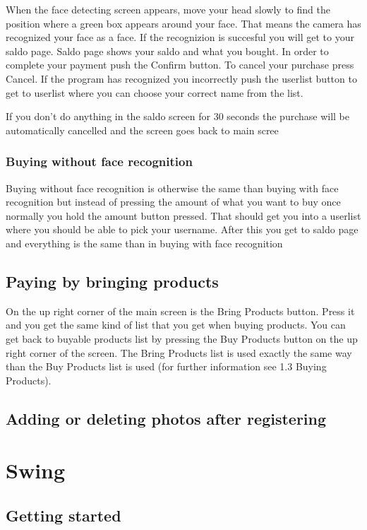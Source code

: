 \documentclass[11pt]{article}
\begin{document}
When the face detecting screen appears, move your head slowly to find the position where a green box appears around your face. That means the camera has recognized your face as a face. If the recognizion is succesful you will get to your saldo page. Saldo page shows your saldo and what you bought. In order to complete your payment push the Confirm button. To cancel your purchase press Cancel. If the program has recognized you incorrectly push the userlist button to get to userlist where you can choose your correct name from the list.

If you don’t do anything in the saldo screen for 30 seconds the purchase will be automatically cancelled and the screen goes back to main scree

\subsubsection*{Buying without face recognition}
Buying without face recognition is otherwise the same than buying with face recognition but instead of pressing the amount of what you want to buy once normally you hold the amount button pressed. That should get you into a userlist where you should be able to pick your username. After this you get to saldo page and everything is the same than in buying with face recognition

\subsection{Paying by bringing products}

On the up right corner of the main screen is the Bring Products button. Press it and you get the same kind of list that you get when buying products. You can get back to buyable products list by pressing the Buy Products button on the up right corner of the screen. The Bring Products list is used exactly the same way than the Buy Products list is used (for further information see 1.3 Buying Products).

\subsection{Adding or deleting photos after registering}

\section{Swing}
\subsection{Getting started}
\end{document}
